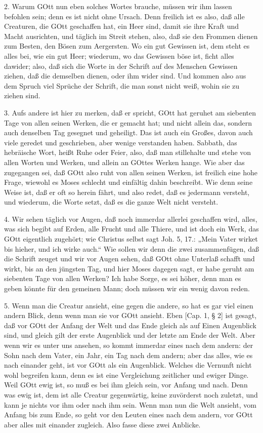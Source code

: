 2. Warum GOtt nun eben solches Wortes brauche, müssen wir ihm lassen befohlen sein; denn es ist nicht ohne Ursach. Denn freilich ist es also, daß alle Creaturen, die GOtt geschaffen hat, ein Heer sind, damit sie ihre Kraft und Macht ausrichten, und täglich im Streit stehen, also, daß sie den Frommen dienen zum Besten, den Bösen zum Aergersten. Wo ein gut Gewissen ist, dem steht es alles bei, wie ein gut Heer; wiederum, wo das Gewissen böse ist, ficht alles dawider; also, daß sich die Worte in der Schrift auf des Menschen Gewissen ziehen, daß die demselben dienen, oder ihm wider sind. Und kommen also aus dem Spruch viel Sprüche der Schrift, die man sonst nicht weiß, wohin sie zu ziehen sind.

3. Aufs andere ist hier zu merken, daß er spricht, GOtt hat geruhet am siebenten Tage von allen seinen Werken, die er gemacht hat; und nicht allein das, sondern auch denselben Tag gesegnet und geheiligt. Das ist auch ein Großes, davon auch viele geredet und geschrieben, aber wenige verstanden haben. Sabbath, das hebräische Wort, heißt Ruhe oder Feier, also, daß man stillehalte und stehe von allen Worten und Werken, und allein an GOttes Werken hange. Wie aber das zugegangen sei, daß GOtt also ruht von allen seinen Werken, ist freilich eine hohe Frage, wiewohl es Moses schlecht und einfältig dahin beschreibt. Wie denn seine Weise ist, daß er oft so herein fährt, und also redet, daß es jedermann versteht, und wiederum, die Worte setzt, daß es die ganze Welt nicht versteht.

4. Wir sehen täglich vor Augen, daß noch immerdar allerlei geschaffen wird, alles, was sich begibt auf Erden, alle Frucht und alle Thiere, und ist doch ein Werk, das GOtt eigentlich zugehört; wie Christus selbst sagt Joh. 5, 17.: „Mein Vater wirket bis hieher, und ich wirke
auch.“ Wie sollen wir denn die zwei zusammenfügen, daß die Schrift zeuget und wir vor Augen sehen, daß GOtt ohne Unterlaß schafft und wirkt, bis an den jüngsten Tag, und hier Moses dagegen sagt, er habe geruht am siebenten Tage von allen Werken? Ich habe Sorge, es sei höher, denn man es geben könnte für den gemeinen Mann; doch müssen wir ein wenig davon reden.

5. Wenn man die Creatur ansieht, eine gegen die andere, so hat es gar viel einen andern Blick, denn wenn man sie vor GOtt ansieht. Eben [Cap. 1, § 2] ist gesagt, daß vor GOtt der Anfang der Welt und das Ende gleich als auf Einen Augenblick sind, und gleich gilt der erste Augenblick und der letzte am Ende der Welt. Aber wenn wir es unter uns ansehen, so kommt immerdar eines nach dem andern: der Sohn nach dem Vater, ein Jahr, ein Tag nach dem andern; aber das alles, wie es nach einander geht, ist vor GOtt als ein Augenblick. Welches die Vernunft nicht wohl begreifen kann, denn es ist eine Vergleichung zeitlicher und ewiger Dinge. Weil GOtt ewig ist, so muß es bei ihm gleich sein, vor Anfang und nach. Denn was ewig ist, dem ist alle Creatur gegenwärtig, keine zuvörderst noch zuletzt, und kann je nichts vor ihm oder nach ihm sein. Wenn man nun die Welt ansieht, vom Anfang bis zum Ende, so geht vor den Leuten eines nach dem andern, vor GOtt aber alles mit einander zugleich. Also fasse diese zwei Anblicke.

